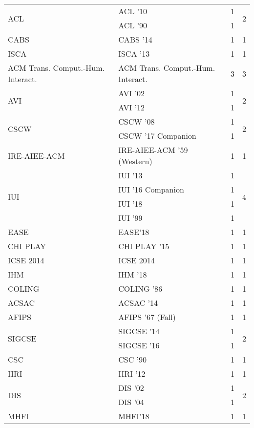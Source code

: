 \begin{table*}[t]
\begin{tabular}{llrr}
\multirow{2}{*}{ACL } & ACL '10 & 1 & \multirow{2}{*}{2}\\
& ACL '90 & 1 &\\
\multirow{1}{*}{CABS } & CABS '14 & 1 & \multirow{1}{*}{1}\\
\multirow{1}{*}{ISCA } & ISCA '13 & 1 & \multirow{1}{*}{1}\\
\multirow{1}{*}{ACM Trans. Comput.-Hum. Interact.} & ACM Trans. Comput.-Hum. Interact. & 3 & \multirow{1}{*}{3}\\
\multirow{2}{*}{AVI } & AVI '02 & 1 & \multirow{2}{*}{2}\\
& AVI '12 & 1 &\\
\multirow{2}{*}{CSCW } & CSCW '08 & 1 & \multirow{2}{*}{2}\\
& CSCW '17 Companion & 1 &\\
\multirow{1}{*}{IRE-AIEE-ACM } & IRE-AIEE-ACM '59 (Western) & 1 & \multirow{1}{*}{1}\\
\multirow{4}{*}{IUI } & IUI '13 & 1 & \multirow{4}{*}{4}\\
& IUI '16 Companion & 1 &\\
& IUI '18 & 1 &\\
& IUI '99 & 1 &\\
\multirow{1}{*}{EASE} & EASE'18 & 1 & \multirow{1}{*}{1}\\
\multirow{1}{*}{CHI PLAY } & CHI PLAY '15 & 1 & \multirow{1}{*}{1}\\
\multirow{1}{*}{ICSE 2014} & ICSE 2014 & 1 & \multirow{1}{*}{1}\\
\multirow{1}{*}{IHM } & IHM '18 & 1 & \multirow{1}{*}{1}\\
\multirow{1}{*}{COLING } & COLING '86 & 1 & \multirow{1}{*}{1}\\
\multirow{1}{*}{ACSAC } & ACSAC '14 & 1 & \multirow{1}{*}{1}\\
\multirow{1}{*}{AFIPS } & AFIPS '67 (Fall) & 1 & \multirow{1}{*}{1}\\
\multirow{2}{*}{SIGCSE } & SIGCSE '14 & 1 & \multirow{2}{*}{2}\\
& SIGCSE '16 & 1 &\\
\multirow{1}{*}{CSC } & CSC '90 & 1 & \multirow{1}{*}{1}\\
\multirow{1}{*}{HRI } & HRI '12 & 1 & \multirow{1}{*}{1}\\
\multirow{2}{*}{DIS } & DIS '02 & 1 & \multirow{2}{*}{2}\\
& DIS '04 & 1 &\\
\multirow{1}{*}{MHFI} & MHFI'18 & 1 & \multirow{1}{*}{1}\\

\end{tabular}
\end{table*}
